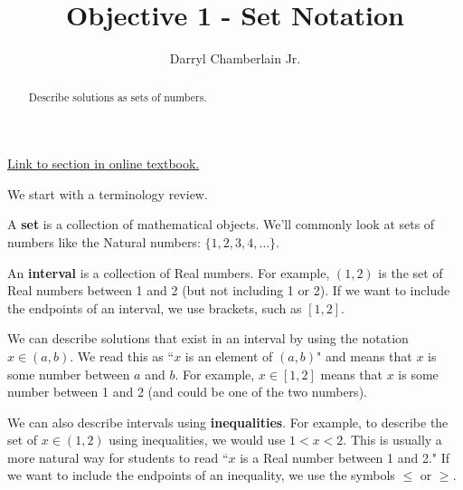 \documentclass{ximera}
\author{Darryl Chamberlain Jr.}
\title{Objective 1 - Set Notation}
\begin{document}
\begin{abstract}
Describe solutions as sets of numbers. 
\end{abstract}
\maketitle

\href{https://cnx.org/contents/mwjClAV_@8.1:uIjtHMfW@9/Linear-Inequalities-and-Absolute-Value-Inequalities}{Link to section in online textbook.}


We start with a terminology review. 

A \textbf{set} is a collection of mathematical objects. We'll commonly look at sets of numbers like the Natural numbers: $\{ 1, 2, 3, 4, \ldots \}$. 

An \textbf{interval} is a collection of Real numbers. For example, $(1, 2)$ is the set of Real numbers between 1 and 2 (but not including 1 or 2). If we want to include the endpoints of an interval, we use brackets, such as $[1, 2]$. 

We can describe solutions that exist in an interval by using the notation $x \in (a, b)$. We read this as ``$x$ is an element of $(a, b)$" and means that $x$ is some number between $a$ and $b$. For example, $x \in [1, 2]$ means that $x$ is some number between 1 and 2 (and could be one of the two numbers). 

We can also describe intervals using \textbf{inequalities}. For example, to describe the set of $x \in (1, 2)$ using inequalities, we would use $1 < x < 2$. This is usually a more natural way for students to read ``$x$ is a Real number between 1 and 2." If we want to include the endpoints of an inequality, we use the symbols $\leq$ or $\geq$. 
\end{document}
